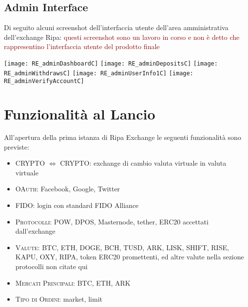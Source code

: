 \documentclass[11pt,fleqn]{book} %
\begin{document}
\subsection{Admin Interface}
Di seguito alcuni screenshot dell'interfaccia utente dell'area amministrativa dell'exchange Ripa:
\textcolor{darkred}{questi screenshot sono un lavoro in corso e non è detto che rappresentino l'interfaccia utente del prodotto finale}
\begin{center}
	\texttt{[image: RE\_adminDashboardC]}
	\texttt{[image: RE\_adminDepositsC]}
	\texttt{[image: RE\_adminWithdrawsC]}
	\texttt{[image: RE\_adminUserInfo1C]}
	\texttt{[image: RE\_adminVerifyAccountC]}
\end{center}

\section{Funzionalità al Lancio}
All'apertura della prima istanza di Ripa Exchange le seguenti funzionalità sono previste:
\begin{itemize}
	\item \textsc{\textsc{CRYPTO $\Leftrightarrow$ CRYPTO}}: exchange di cambio valuta virtuale in valuta virtuale
	\item \textsc{\textsc{OAuth}}: Facebook, Google, Twitter
	\item \textsc{\textsc{FIDO}}: login con standard FIDO Alliance
	\item \textsc{\textsc{Protocolli}}: POW, DPOS, Masternode, tether, ERC20 accettati dall'exchange
	\item \textsc{\textsc{Valute}}: BTC, ETH, DOGE, BCH, TUSD, ARK, LISK, SHIFT, RISE, KAPU, OXY, RIPA, token ERC20 promettenti, 
	ed altre valute nella sezione protocolli non citate qui
	\item \textsc{\textsc{Mercati Principali}}: BTC, ETH, ARK
	\item \textsc{\textsc{Tipo di Ordini}}: market, limit
\end{itemize}
\end{document}
